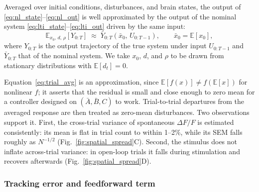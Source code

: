\begin{assumption}
\label{assm:trial_avg}
Averaged over initial conditions, disturbances, and brain states, the output of
\eqref{eq:nl_state}--\eqref{eq:nl_out} is well approximated by the output of the
nominal system \eqref{eq:lti_state}--\eqref{eq:lti_out} driven by the same
input:
\begin{equation}
    \mathbb{E}_{x_{0},\,d,\,\rho}\!\left[Y_{0:T}\right]
    \;\approx\; \bar{Y}_{0:T}\!\left(\bar{x}_{0},\,U_{0:T-1}\right),
    \qquad \bar{x}_{0} = \mathbb{E}[x_{0}],
    \label{eq:trial_avg}
\end{equation}
where $Y_{0:T}$ is the output trajectory of the true system under input
$U_{0:T-1}$ and $\bar{Y}_{0:T}$ that of the nominal system. We take $x_0$, $d$,
and $\rho$ to be drawn from stationary distributions with
$\mathbb{E}[d_t] = 0$.
\end{assumption}

Equation~\eqref{eq:trial_avg} is an approximation, since
$\mathbb{E}[f(x)] \neq f(\mathbb{E}[x])$ for nonlinear $f$; it asserts that the
residual is small and close enough to zero mean for a controller designed on
$(\bar A, \bar B, C)$ to work. Trial-to-trial departures from the averaged
response are then treated as zero-mean disturbances. Two observations support
it. First, the cross-trial
variance of spontaneous $\Delta F/F$ is estimated consistently: its mean is flat
in trial count to within 1--2\%, while its SEM falls roughly as $N^{-1/2}$
(Fig.~\ref{fig:spatial_spread}C). Second, the stimulus does not inflate
across-trial variance: in open-loop trials it falls during stimulation and
recovers afterwards (Fig.~\ref{fig:spatial_spread}D).

\subsubsection*{Tracking error and feedforward term}

